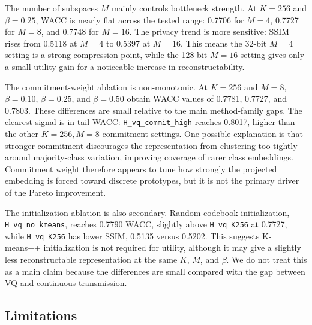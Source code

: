 \documentclass{article}
\begin{document}
The number of subspaces $M$ mainly controls bottleneck strength. At $K=256$ and $\beta=0.25$, WACC is nearly flat across the tested range: 0.7706 for $M=4$, 0.7727 for $M=8$, and 0.7748 for $M=16$. The privacy trend is more sensitive: SSIM rises from 0.5118 at $M=4$ to 0.5397 at $M=16$. This means the 32-bit $M=4$ setting is a strong compression point, while the 128-bit $M=16$ setting gives only a small utility gain for a noticeable increase in reconstructability.

The commitment-weight ablation is non-monotonic. At $K=256$ and $M=8$, $\beta=0.10$, $\beta=0.25$, and $\beta=0.50$ obtain WACC values of 0.7781, 0.7727, and 0.7803. These differences are small relative to the main method-family gaps. The clearest signal is in tail WACC: \texttt{H\_vq\_commit\_high} reaches 0.8017, higher than the other $K=256,M=8$ commitment settings. One possible explanation is that stronger commitment discourages the representation from clustering too tightly around majority-class variation, improving coverage of rarer class embeddings. Commitment weight therefore appears to tune how strongly the projected embedding is forced toward discrete prototypes, but it is not the primary driver of the Pareto improvement.

The initialization ablation is also secondary. Random codebook initialization, \texttt{H\_vq\_no\_kmeans}, reaches 0.7790 WACC, slightly above \texttt{H\_vq\_K256} at 0.7727, while \texttt{H\_vq\_K256} has lower SSIM, 0.5135 versus 0.5202. This suggests K-means++ initialization is not required for utility, although it may give a slightly less reconstructable representation at the same $K$, $M$, and $\beta$. We do not treat this as a main claim because the differences are small compared with the gap between VQ and continuous transmission.

\subsection{Limitations}
\end{document}
